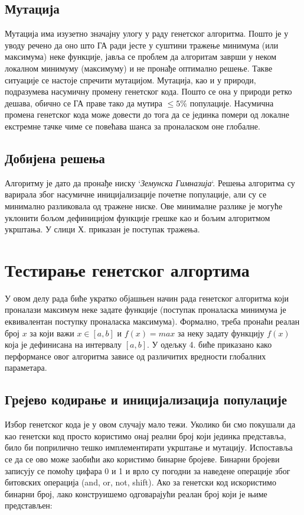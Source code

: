 \documentclass{article}
\begin{document}
\subsection{Мутација}
Мутација има изузетно значајну улогу у раду генетског алгоритма. Пошто је у уводу речено
да оно што ГА ради јесте у суштини тражење минимума (или максимума) неке функције, јавља се 
проблем да алгоритам заврши у неком локалном минимуму (максимуму) и не пронађе 
оптимално решење. Такве ситуације се настоје спречити мутацијом. Мутација, као и у природи,
подразумева насумичну промену генетског кода. Пошто се она у природи ретко дешава, обично
се ГА праве тако да мутира $\leq 5 \%$ популације. Насумична промена генетског кода 
може довести до тога да се јединка помери од локалне екстремне тачке чиме се повећава 
шанса за проналаском оне глобалне.

\subsection{Добијена решења}
Алгоритму је дато да пронађе ниску `\textit{Земунска Гимназија}`. Решења алгоритма су варирала
због насумичне иницијализације почетне популације, али су се минимално разликовала од тражене ниске.
Ове минималне разлике је могуће уклонити бољом дефиницијом функције грешке као и бољим алгоритмом укрштања.
У слици Х. приказан је поступак тражења.


\section{Тестирање генетског алгортима}
У овом делу рада биће укратко објашњен начин рада генетског алгоритма који проналази
максимум неке задате функције (поступак проналаска минимума је еквивалентан поступку
проналаска максимума). Формално, треба пронаћи реалан број $x$ за који важи $x \in [a, b]$ и 
$f(x) = max$ за неку задату функцију $f(x)$ која је дефинисана на интервалу $[a, b]$. 
У одељку 4. биће приказано како перформансе овог алгоритма зависе од различитих 
вредности глобалних параметара.

\subsection{Грејево кодирање и иницијализација популације}
Избор генетског кода је у овом случају мало тежи. Уколико би смо покушали да као генетски код
просто користимо онај реални број који јединка представља, било би поприлично тешко 
имплементирати укрштање и мутацију. Испоставља се да се ово може заобићи ако користимо
бинарне бројеве. Бинарни бројеви записују се помоћу цифара 0 и 1 и врло су погодни за 
наведене операције због битовских операција (and, or, not, shift). Ако за генетски код
искористимо бинарни број, лако конструишемо одговарајући реалан број који је њиме представљен:
\end{document}
